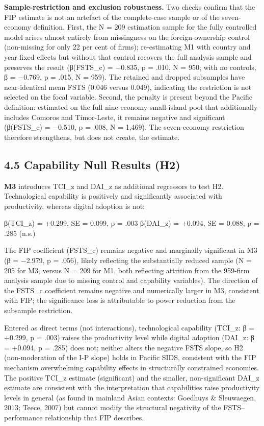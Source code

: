 \documentclass[
  12pt]{article}
\begin{document}
\textbf{Sample-restriction and exclusion robustness.} Two checks confirm
that the FIP estimate is not an artefact of the complete-case sample or
of the seven-economy definition. First, the N = 209 estimation sample
for the fully controlled model arises almost entirely from missingness
on the foreign-ownership control (non-missing for only 22 per cent of
firms); re-estimating M1 with country and year fixed effects but without
that control recovers the full analysis sample and preserves the result
(β(FSTS\_c) = −0.835, p = .010, N = 950; with no controls, β = −0.769, p
= .015, N = 959). The retained and dropped subsamples have
near-identical mean FSTS (0.046 versus 0.049), indicating the
restriction is not selected on the focal variable. Second, the penalty
is present beyond the Pacific definition: estimated on the full
nine-economy small-island pool that additionally includes Comoros and
Timor-Leste, it remains negative and significant (β(FSTS\_c) = −0.510, p
= .008, N = 1,469). The seven-economy restriction therefore strengthens,
but does not create, the estimate.

\hypertarget{capability-null-results-h2}{%
\subsection{4.5 Capability Null Results
(H2)}\label{capability-null-results-h2}}

\textbf{M3} introduces TCI\_z and DAI\_z as additional regressors to
test H2. Technological capability is positively and significantly
associated with productivity, whereas digital adoption is not:

β(TCI\_z) = +0.299, SE = 0.099, p = .003 β(DAI\_z) = +0.094, SE = 0.088,
p = .285 (n.s.)

The FIP coefficient (FSTS\_c) remains negative and marginally
significant in M3 (β = −2.979, p = .056), likely reflecting the
substantially reduced sample (N = 205 for M3, versus N = 209 for M1,
both reflecting attrition from the 959-firm analysis sample due to
missing control and capability variables). The direction of the FSTS\_c
coefficient remains negative and numerically larger in M3, consistent
with FIP; the significance loss is attributable to power reduction from
the subsample restriction.

Entered as direct terms (not interactions), technological capability
(TCI\_z: β = +0.299, p = .003) raises the productivity level while
digital adoption (DAI\_z: β = +0.094, p = .285) does not; neither alters
the negative FSTS slope, so H2 (non-moderation of the I-P slope) holds
in Pacific SIDS, consistent with the FIP mechanism overwhelming
capability effects in structurally constrained economies. The positive
TCI\_z estimate (significant) and the smaller, non-significant DAI\_z
estimate are consistent with the interpretation that capabilities raise
productivity levels in general (as found in mainland Asian contexts:
Goedhuys \& Sleuwaegen, 2013; Teece, 2007) but cannot modify the
structural negativity of the FSTS--performance relationship that FIP
describes.
\end{document}
